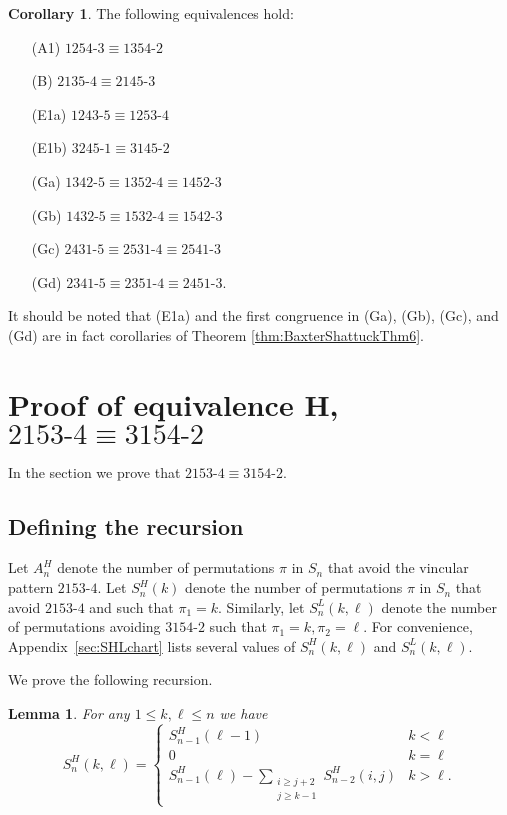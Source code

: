 \documentclass[11pt]{amsart}
\newtheorem{lemma}[theorem]{Lemma}
\theoremstyle{definition}
\newtheorem{corollary}[theorem]{Corollary}
\begin{document}
\begin{corollary} \label{cor:Inductive5quasi}
    The following equivalences hold:
	\begin{enumerate}
		\item[(A1)] $1254{\text{-}}3 \equiv 1354{\text{-}}2$
		\item[(B)] $2135{\text{-}}4 \equiv 2145{\text{-}}3$
        \item[(E1a)] $1243{\text{-}}5 \equiv 1253{\text{-}}4$
        \item[(E1b)] $3245{\text{-}}1 \equiv 3145{\text{-}}2$
		\item[(Ga)] $1342{\text{-}}5 \equiv 1352{\text{-}}4 \equiv 1452{\text{-}}3$
		\item[(Gb)] $1432{\text{-}}5 \equiv 1532{\text{-}}4 \equiv 1542{\text{-}}3$
		\item[(Gc)] $2431{\text{-}}5 \equiv 2531{\text{-}}4 \equiv 2541{\text{-}}3$
		\item[(Gd)] $2341{\text{-}}5 \equiv 2351{\text{-}}4 \equiv 2451{\text{-}}3$.
	\end{enumerate}
\end{corollary}

It should be noted that (E1a) and the first congruence in (Ga), (Gb), (Gc), and (Gd) are in fact corollaries of Theorem \ref{thm:BaxterShattuckThm6}. 

\section{Proof of equivalence H, $2153{\text{-}}4 \equiv 3154{\text{-}}2$}
\label{sec:H}
In the section we prove that $2153{\text{-}}4 \equiv 3154{\text{-}}2$.

\subsection{Defining the recursion}
Let $A_n^{H}$ denote the number of permutations $\pi$ in $S_n$
that avoid the vincular pattern $2153{\text{-}}4$.
Let $S_n^{H}(k)$ denote the number of permutations $\pi$
in $S_n$ that avoid $2153{\text{-}}4$ and such that $\pi_1 = k$.
Similarly, let $S_n^{L}(k, \ell)$ denote the number of permutations
avoiding $3154{\text{-}}2$ such that $\pi_1 = k, \pi_2 = \ell$.
For convenience, Appendix~\ref{sec:SHLchart}
lists several values of $S_n^H(k, \ell)$ and $S_n^L(k,\ell)$.

We prove the following recursion.
\begin{lemma}
	\label{lem:2153-4Rec}
	For any $1 \le k, \ell \le n$ we have
	\[ S_n^H(k, \ell) = 
    \begin{cases} 
      S_{n-1}^H(\ell-1) & k < \ell \\
	  0 & k = \ell \\
      S_{n-1}^H(\ell) - 
	  \displaystyle\sum_{\substack{i \ge j+2 \\ j \ge k-1}} S_{n-2}^H(i, j) & k > \ell.
   \end{cases}
   \]
\end{lemma}
\end{document}

